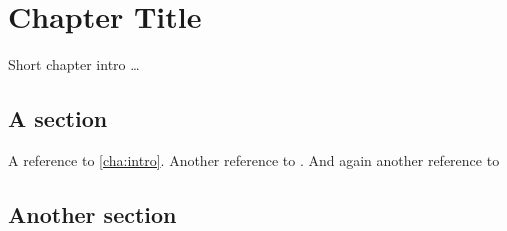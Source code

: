 \chapter{Chapter Title}
\label{cha:title}

Short chapter intro \ldots

\section{A section}

A reference to \ref{cha:intro}.
Another reference to .
And again another reference to 



\section{Another section}



